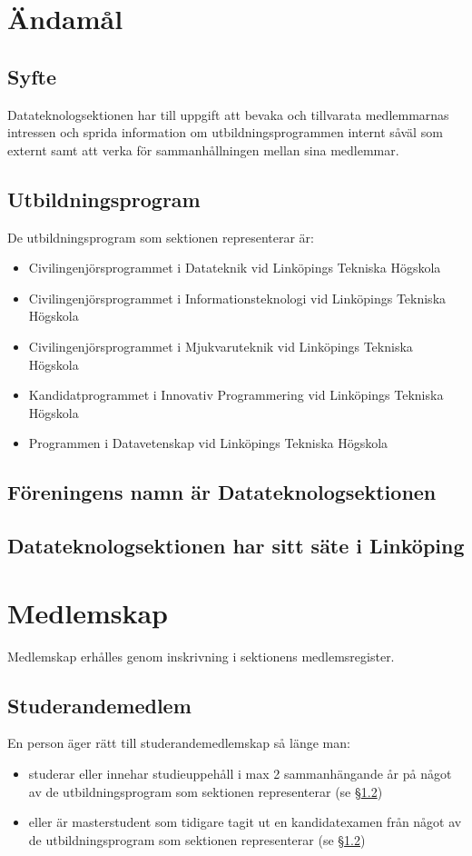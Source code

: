 \documentclass{datateknologsektionen-document}
\begin{document}
  \section{Ändamål}
    \subsection{Syfte}
      \label{syfte}
      Datateknologsektionen har till uppgift att bevaka och tillvarata medlemmarnas intressen
      och sprida information om utbildningsprogrammen internt såväl som externt samt att
      verka för sammanhållningen mellan sina medlemmar.
    \subsection{Utbildningsprogram}
      \label{utbildningsprogram}
      De utbildningsprogram som sektionen representerar är:
      \begin{itemize}
        \item Civilingenjörsprogrammet i Datateknik vid Linköpings Tekniska Högskola
        \item Civilingenjörsprogrammet i Informationsteknologi vid Linköpings Tekniska Högskola
        \item Civilingenjörsprogrammet i Mjukvaruteknik vid Linköpings Tekniska Högskola
        \item Kandidatprogrammet i Innovativ Programmering vid Linköpings Tekniska Högskola
        \item Programmen i Datavetenskap vid Linköpings Tekniska Högskola
      \end{itemize}
      
    \subsection{Föreningens namn är Datateknologsektionen}
    \subsection{Datateknologsektionen har sitt säte i Linköping}
  \section{Medlemskap}
    \label{medlemskap}
    Medlemskap erhålles genom inskrivning i sektionens medlemsregister.
    \subsection{Studerandemedlem}
      En person äger rätt till studerandemedlemskap så länge man:
      \begin{itemize}
        \item studerar eller innehar studieuppehåll i max 2 sammanhängande år på något av de
        utbildningsprogram som sektionen representerar (se \S \ref{utbildningsprogram})
        \item eller är masterstudent som tidigare tagit ut en kandidatexamen från något av de
        utbildningsprogram som sektionen representerar (se \S \ref{utbildningsprogram})
      \end{itemize}
\end{document}

